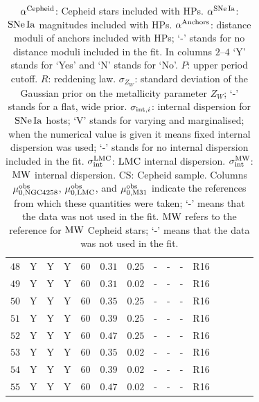 \begin{table}[tbp]
{\begin{tabular}{lcccccccccccccr}
\rule[-1ex]{0pt}{2.5ex} $48$ & Y & Y & Y & $60$ & $0.31 $ & $0.25$ & - & - & - & R16 & \cite{Riess:2016jrr} & \cite{Pietrzynski:2013gia} & \cite{Riess:2016jrr} & \cite{Riess:2016jrr} \\ 
\rule[-1ex]{0pt}{2.5ex} $49$ & Y & Y & Y & $60$ & $0.31 $ & $0.02$ & - & - & - & R16 & \cite{Riess:2016jrr} & \cite{Pietrzynski:2013gia} & \cite{Riess:2016jrr} & \cite{Riess:2016jrr} \\
\rule[-1ex]{0pt}{2.5ex} $50$ & Y & Y & Y & $60$ & $0.35 $ & $0.25$ & - & - & - & R16 & \cite{Riess:2016jrr} & \cite{Pietrzynski:2013gia} & \cite{Riess:2016jrr} & \cite{Riess:2016jrr} \\
\rule[-1ex]{0pt}{2.5ex} $51$ & Y & Y & Y & $60$ & $0.39 $ & $0.25$ & - & - & - & R16 & \cite{Riess:2016jrr} & \cite{Pietrzynski:2013gia} & \cite{Riess:2016jrr} & \cite{Riess:2016jrr} \\
\rule[-1ex]{0pt}{2.5ex} $52$ & Y & Y & Y & $60$ & $0.47 $ & $0.25$ & - & - & - & R16 & \cite{Riess:2016jrr} & \cite{Pietrzynski:2013gia} & \cite{Riess:2016jrr} & \cite{Riess:2016jrr} \\
\rule[-1ex]{0pt}{2.5ex} $53$ & Y & Y & Y & $60$ & $0.35 $ & $0.02$ & - & - & - & R16 & \cite{Riess:2016jrr} & \cite{Pietrzynski:2013gia} & \cite{Riess:2016jrr} & \cite{Riess:2016jrr} \\
\rule[-1ex]{0pt}{2.5ex} $54$ & Y & Y & Y & $60$ & $0.39 $ & $0.02$ & - & - & - & R16 & \cite{Riess:2016jrr} & \cite{Pietrzynski:2013gia} & \cite{Riess:2016jrr} & \cite{Riess:2016jrr} \\
\rule[-1ex]{0pt}{2.5ex} $55$ & Y & Y & Y & $60$ & $0.47 $ & $0.02$ & - & - & - & R16 & \cite{Riess:2016jrr} & \cite{Pietrzynski:2013gia} & \cite{Riess:2016jrr} & \cite{Riess:2016jrr} \\
\hline
\end{tabular}}
\caption{$\alpha^{\mathrm{Cepheid}}$: Cepheid stars included with HPs. $\alpha^{\mathrm{SNe\,Ia}}$: $\mathrm{SNe\,Ia}$ magnitudes included with HPs. $\alpha^{\mathrm{Anchors}}$: distance moduli of anchors included with HPs; `-' stands for no distance moduli included in the fit. In columns $2$--$4$ `Y' stands for `Yes' and `N' stands for `No'. $P$: upper period cutoff. $R$: reddening law. $\sigma_{Z_W}$: standard deviation of the Gaussian prior on the metallicity parameter $Z_W$; `-' stands for a flat, wide prior. $\sigma_{\mathrm{int},i}$: internal dispersion for $\mathrm{SNe\,Ia}$ hosts; `V' stands for varying and marginalised; when the numerical value is given it means fixed internal dispersion was used; `-' stands for no internal dispersion included in the fit. $\sigma_{\mathrm{int}}^{\mathrm{LMC}}$: $\mathrm{LMC}$ internal dispersion. $\sigma_{\mathrm{int}}^{\mathrm{MW}}$: $\mathrm{MW}$ internal dispersion. CS: Cepheid sample. Columns $\mu_{0,\mathrm{NGC4258}}^{\mathrm{obs}}$, $\mu_{0,\mathrm{LMC}}^{\mathrm{obs}}$, and $\mu_{0,\mathrm{M31}}^{\mathrm{obs}}$ indicate the references from which these quantities were taken; `-' means that the data was not used in the fit. $\mathrm{MW}$ refers to the reference for $\mathrm{MW}$ Cepheid stars; `-' means that the data was not used in the fit. \label{Table:details-fits}}
\end{table}

